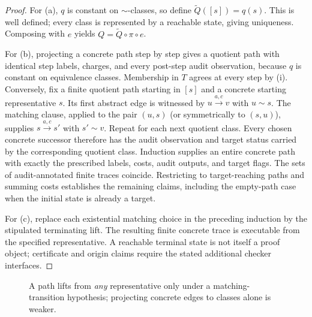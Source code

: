 \documentclass[11pt,letterpaper]{article}
\theoremstyle{definition}
\begin{document}
\begin{proof}
For (a), $q$ is constant on $\sim$-classes, so define $\widetilde Q([s])=q(s)$. This is well defined; every class is represented by a reachable state, giving uniqueness. Composing with $e$ yields $Q=\widetilde Q\circ\pi\circ e$.

For (b), projecting a concrete path step by step gives a quotient path with identical step labels, charges, and every post-step audit observation, because $q$ is constant on equivalence classes. Membership in $T$ agrees at every step by (i). Conversely, fix a finite quotient path starting in $[s]$ and a concrete starting representative $s$. Its first abstract edge is witnessed by $u\xrightarrow{a,c}v$ with $u\sim s$. The matching clause, applied to the pair $(u,s)$ (or symmetrically to $(s,u)$), supplies $s\xrightarrow{a,c}s'$ with $s'\sim v$. Repeat for each next quotient class. Every chosen concrete successor therefore has the audit observation and target status carried by the corresponding quotient class. Induction supplies an entire concrete path with exactly the prescribed labels, costs, audit outputs, and target flags. The sets of audit-annotated finite traces coincide. Restricting to target-reaching paths and summing costs establishes the remaining claims, including the empty-path case when the initial state is already a target.

For (c), replace each existential matching choice in the preceding induction by the stipulated terminating lift. The resulting finite concrete trace is executable from the specified representative. A reachable terminal state is not itself a proof object; certificate and origin claims require the stated additional checker interfaces.\end{proof}

\begin{figure}[htbp]\centering
{}
\caption{A path lifts from \emph{any} representative only under a matching-transition hypothesis; projecting concrete edges to classes alone is weaker.}
\label{fig:matching}
\end{figure}
\end{document}
